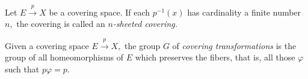 \documentclass[12pt]{article}
\begin{document}
\begin{defn} \label{defn:sheetedcovering}
	Let $E \overset{p}{\longrightarrow} X$ be a covering space. If each $p^{-1}(x)$ has cardinality a finite number $n,$ the covering is called an \emph{$n$-sheeted covering.}
\end{defn}

\begin{defn}
	Given a covering space $E \overset{p}{\longrightarrow} X,$ the group $G$ of \emph{covering transformations} is the group of all homeomorphisms of $E$ which preserves the fibers, that is, all those $\varphi$ such that $p\varphi = p.$

	\begin{center}
	\end{center}
\end{defn}
\end{document}
